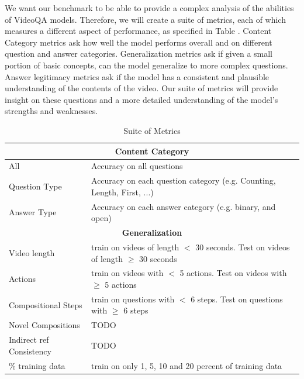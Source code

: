 \documentclass[10pt,twocolumn,letterpaper]{article}
\newcommand{\mgm}[1]{{\color{cyan}{mgm: #1}}}
\begin{document}
We want our benchmark to be able to provide a complex analysis of the abilities of VideoQA models. Therefore, we will create a suite of metrics, each of which measures a different aspect of performance, as specified in Table \mgm{how to refer to this?}. Content Category metrics ask how well the model performs overall and on different question and answer categories. Generalization metrics ask if given a small portion of basic concepts, can the model generalize to more complex questions. Answer legitimacy metrics ask if the model has a consistent and plausible understanding of the contents of the video. Our suite of metrics will provide insight on these questions and a more detailed understanding of the model's strengths and weaknesses.



\begin{table}[]
    \begin{center}
    \caption{Suite of Metrics}
    \label{tab:table1}
    \begin{tabular}{|p{2cm}|p{5cm}|}
     \hline
     \multicolumn{2}{|c|}{\textbf{Content Category}}\\
    \hline
    All & Accuracy on all questions\\
    \hline
    Question Type & Accuracy on each question category (e.g. Counting, Length, First, ...)\\
    \hline
    Answer Type & Accuracy on each answer category (e.g. binary, and open)\\
    \hline
    
    
     \multicolumn{2}{|c|}{\textbf{Generalization}}\\
    \hline
    Video length & train on videos of length $<$ 30 seconds. Test on videos of length $\geq$ 30 seconds \\
    \hline
    Actions & train on videos with $<$ 5 actions. Test on videos with $\geq$ 5 actions  \\
    \hline
    Compositional Steps &  train on questions with $<$ 6 steps. Test on questions with $\geq$ 6 steps  \\
    \hline
    Novel Compositions & TODO \\
    \hline
    Indirect ref Consistency & TODO \\
    \hline
    \% training data & train on only 1, 5, 10 and 20 percent of training data \\
    \hline
    

\end{tabular}
\end{center}
\end{table}
\end{document}
